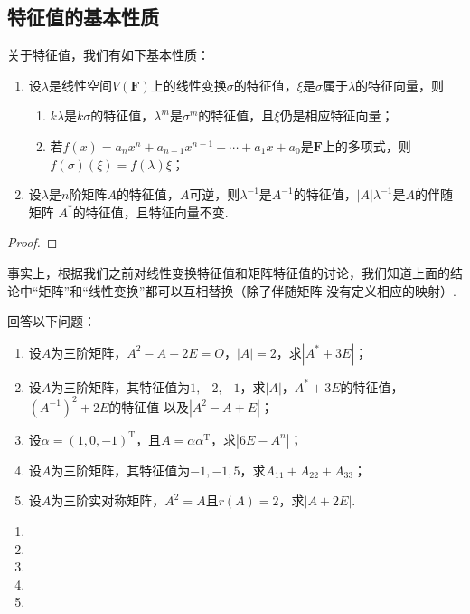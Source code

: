 \subsection{特征值的基本性质}
关于特征值，我们有如下基本性质：
\begin{enumerate}
    \item 设$\lambda$是线性空间$V(\mathbf{F})$上的线性变换$\sigma$的特征值，$\xi$是$\sigma$属于$\lambda$的特征向量，则
    \begin{enumerate}
        \item $k\lambda$是$k\sigma$的特征值，$\lambda^m$是$\sigma^m$的特征值，且$\xi$仍是相应特征向量；
        \item 若$f(x)=a_nx^n+a_{n-1}x^{n-1}+\cdots+a_1x+a_0$是$\mathbf{F}$上的多项式，则$f(\sigma)(\xi)=f(\lambda)\xi$；
    \end{enumerate}
    \item 设$\lambda$是$n$阶矩阵$A$的特征值，$A$可逆，则$\lambda^{-1}$是$A^{-1}$的特征值，$|A|\lambda^{-1}$是$A$的伴随矩阵
    $A^*$的特征值，且特征向量不变.
\end{enumerate}
\begin{proof}
    
\end{proof}

事实上，根据我们之前对线性变换特征值和矩阵特征值的讨论，我们知道上面的结论中``矩阵''和``线性变换''都可以互相替换（除了伴随矩阵
没有定义相应的映射）.

\begin{example}
    回答以下问题：
    \begin{enumerate}[label=(\arabic*)]
        \item 设$A$为三阶矩阵，$A^2-A-2E=O$，$|A|=2$，求$|A^*+3E|$；

        \item 设$A$为三阶矩阵，其特征值为$1,-2,-1$，求$|A|$，$A^*+3E$的特征值，$(A^{-1})^2+2E$的特征值
            以及$|A^2-A+E|$；

        \item 设$\alpha=(1,0,-1)^\mathrm{T}$，且$A=\alpha\alpha^\mathrm{T}$，求$|6E-A^n|$；

        \item 设$A$为三阶矩阵，其特征值为$-1,-1,5$，求$A_{11}+A_{22}+A_{33}$；

        \item 设$A$为三阶实对称矩阵，$A^2=A$且$r(A)=2$，求$|A+2E|$.
    \end{enumerate}
\end{example}
\begin{solution}
\begin{enumerate}[label=(\arabic*)]
    \item 
    \item 
    \item 
    \item 
    \item 
\end{enumerate}
\end{solution}

